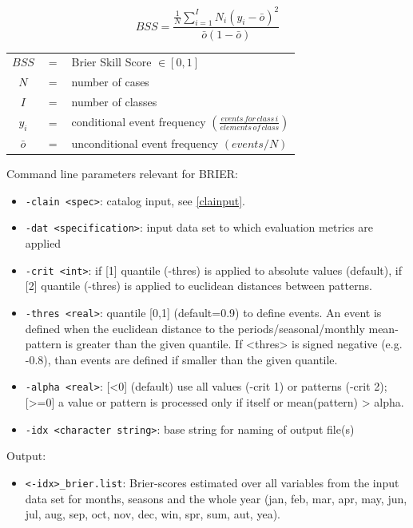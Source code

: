 \documentclass[12pt, oneside, a4paper, headsepline, plainheadsepline]{scrbook}
\begin{document}
\begin{equation}\label{eq:brier}
BSS = \frac{ \frac{1}{N} \sum_{i=1}^I N_{i} (y_{i}-\bar{o})^{2} }{ \bar{o}(1-\bar{o}) }
\end{equation}
\parbox[l]{\textwidth}{ \medskip
\begin{tabular}[c]{cll}
	$ BSS $ & $=$ & Brier Skill Score $ \in [0,1] $ \\
	$ N $ & $=$ & number of cases \\
	$ I $ & $=$ & number of classes \\
    $ y_{i} $ & $=$ & conditional event frequency $ ( \frac{ events \, for \, class \, i }{ elements \, of \, class } ) $ \\
    $ \bar{o} $ & $=$ & unconditional event frequency $ ( events / N ) $
\end{tabular}
\medskip }


Command line parameters relevant for BRIER:
\begin{itemize}
\item \verb+-clain <spec>+:  catalog input, see \ref{clainput}.
\item \verb+-dat <specification>+: input data set to which evaluation metrics are applied
\item \verb+-crit <int>+: if [1] quantile (-thres) is applied to absolute values (default), if [2] quantile (-thres) is applied to euclidean distances between patterns.
\item  \verb+-thres <real>+: quantile [0,1] (default=0.9) to define events. An event is defined when the euclidean distance to the periods/seasonal/monthly mean-pattern is greater than the given quantile. If <thres> is signed negative (e.g. -0.8), than events are defined if smaller than the given quantile.
\item \verb+-alpha <real>+: [<0] (default) use all values (-crit 1) or patterns (-crit 2); [>=0] a value or pattern is processed only if itself or mean(pattern) > alpha.
\item  \verb+-idx <character string>+: base string for naming of output file(s)
\end{itemize}


Output:
\begin{itemize}
\item   \verb+<-idx>_brier.list+: Brier-scores estimated over all variables from the input data set for months, seasons and the whole year (jan, feb, mar, apr, may, jun, jul, aug, sep, oct, nov, dec, win, spr, sum, aut, yea).
\end{itemize}
\end{document}
